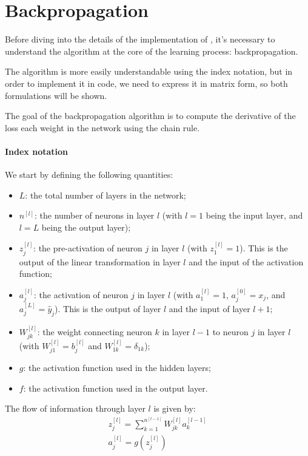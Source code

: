 \section{Backpropagation} \label{sec:backprop}
Before diving into the details of the implementation of \mfnet, it's necessary to understand the algorithm at the core of the learning process: backpropagation.

The algorithm is more easily understandable using the index notation, but in order to implement it in code, we need to express it in matrix form, so both formulations will be shown.

The goal of the backpropagation algorithm is to compute the derivative of the loss \wrt each weight in the network using the chain rule.

\paragraph{Index notation} \label{par:index_notation}
We start by defining the following quantities:
\begin{itemize}
    \item $L$: the total number of layers in the network;
    \item $n^{[l]}$: the number of neurons in layer $l$ (with $l = 1$ being the input layer, and $l = L$ being the output layer);
    \item $z_j^{[l]}$: the pre-activation of neuron $j$ in layer $l$ (with $z_1^{[l]} = 1$). This is the output of the linear transformation in layer $l$ and the input of the activation function;
    \item $a_j^{[l]}$: the activation of neuron $j$ in layer $l$ (with $a_1^{[l]} = 1$, $a_j^{[0]} = x_j$, and $a_j^{[L]} = \hat{y}_j$). This is the output of layer $l$ and the input of layer $l+1$;
    \item $W_{jk}^{[l]}$: the weight connecting neuron $k$ in layer $l-1$ to neuron $j$ in layer $l$ (with $W_{j1}^{[l]} = b_j^{[l]}$ and $W_{1k}^{[l]} = \delta_{1k}$);
    \item $g$: the activation function used in the hidden layers;
    \item $f$: the activation function used in the output layer.
\end{itemize}

The flow of information through layer $l$ is given by:
\begin{gather*}
    z_j^{[l]} = \sum_{k=1}^{n^{[l-1]}} W_{jk}^{[l]} a_k^{[l-1]} \\
    a_j^{[l]} = g\left(z_j^{[l]}\right)
\end{gather*}

